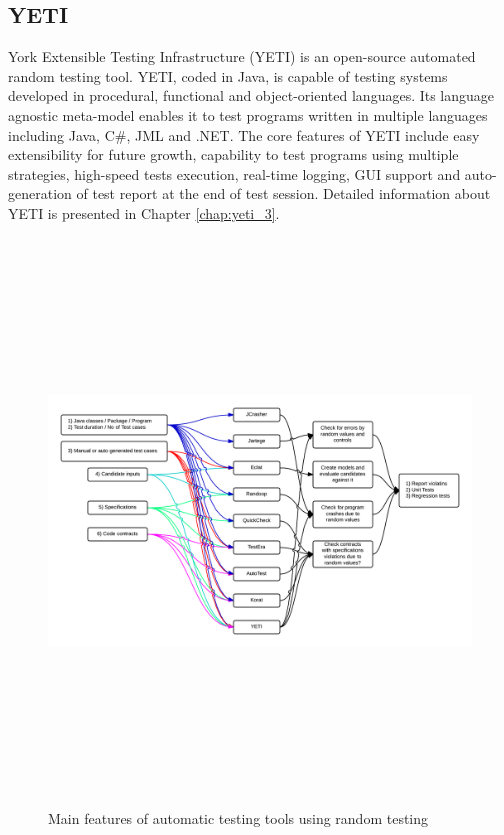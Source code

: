 
\subsection{YETI}
York Extensible Testing Infrastructure (YETI) is an open-source automated random testing tool. YETI, coded in Java, is capable of testing systems developed in procedural, functional and object-oriented languages. Its language agnostic meta-model enables it to test programs written in multiple languages including Java, C\#, JML and .NET. The core features of YETI include easy extensibility for future growth, capability to test programs using multiple strategies, high-speed tests execution, real-time logging, GUI support and auto-generation of test report at the end of test session. Detailed information about YETI is presented in Chapter \ref{chap:yeti_3}.




\begin{figure}
\centering
\centerline{\includegraphics[width=26cm, height=15cm]{chapter2/RandomTools01.png}}
	\caption{Main features of automatic testing tools using random testing}
	\label{fig:Tools}
\end{figure}


